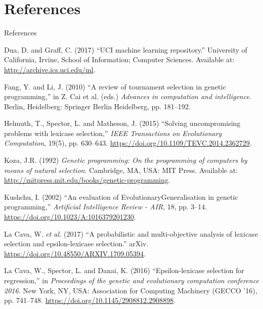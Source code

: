 \documentclass[
  ignorenonframetext,
]{beamer}
\newlength{\cslhangindent}
\newlength{\cslentryspacingunit} %
\newenvironment{CSLReferences}[2] %
 {%
  \setlength{\parindent}{0pt}
  \ifodd #1
  \let\oldpar\par
  \def\par{\hangindent=\cslhangindent\oldpar}
  \fi
  \setlength{\parskip}{#2\cslentryspacingunit}
 }%
 {}
\begin{document}
\hypertarget{references}{%
\section*{References}\label{references}}

\begin{frame}[allowframebreaks]{References}
\hypertarget{refs}{}
\begin{CSLReferences}{0}{0}
\leavevmode{}%
Dua, D. and Graff, C. (2017) {``{UCI} machine learning repository.''}
University of California, Irvine, School of Information; Computer
Sciences. Available at: \url{http://archive.ics.uci.edu/ml}.

\leavevmode{}%
Fang, Y. and Li, J. (2010) {``A review of tournament selection in
genetic programming,''} in Z. Cai et al. (eds.) \emph{Advances in
computation and intelligence}. Berlin, Heidelberg: Springer Berlin
Heidelberg, pp. 181--192.

\leavevmode{}%
Helmuth, T., Spector, L. and Matheson, J. (2015) {``Solving
uncompromising problems with lexicase selection,''} \emph{IEEE
Transactions on Evolutionary Computation}, 19(5), pp. 630--643.
\url{https://doi.org/10.1109/TEVC.2014.2362729}.

\leavevmode{}%
Koza, J.R. (1992) \emph{Genetic programming: On the programming of
computers by means of natural selection}. Cambridge, MA, USA: MIT Press.
Available at: \url{http://mitpress.mit.edu/books/genetic-programming}.

\leavevmode{}%
Kushchu, I. (2002) {``An evaluation of EvolutionaryGeneralisation in
genetic programming,''} \emph{Artificial Intelligence Review - AIR}, 18,
pp. 3--14. \url{https://doi.org/10.1023/A:1016379201230}.

\leavevmode{}%
La Cava, W. \emph{et al.} (2017) {``A probabilistic and multi-objective
analysis of lexicase selection and epsilon-lexicase selection.''} arXiv.
\url{https://doi.org/10.48550/ARXIV.1709.05394}.

\leavevmode{}%
La Cava, W., Spector, L. and Danai, K. (2016) {``Epsilon-lexicase
selection for regression,''} in \emph{Proceedings of the genetic and
evolutionary computation conference 2016}. New York, NY, USA:
Association for Computing Machinery (GECCO '16), pp. 741--748.
\url{https://doi.org/10.1145/2908812.2908898}.


\end{CSLReferences}
\end{frame}
\end{document}
